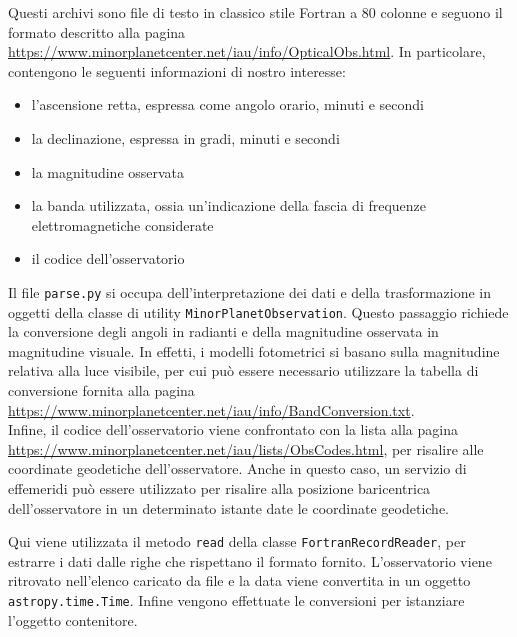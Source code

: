 \documentclass[12pt,a4paper,openright,twoside]{book}
\begin{document}
Questi archivi sono file di testo in classico stile Fortran a 80 colonne e seguono il formato descritto alla pagina \url{https://www.minorplanetcenter.net/iau/info/OpticalObs.html}. In particolare, contengono le seguenti informazioni di nostro interesse:
\begin{itemize}
\item l'ascensione retta, espressa come angolo orario, minuti e secondi
\item la declinazione, espressa in gradi, minuti e secondi
\item la magnitudine osservata
\item la banda utilizzata, ossia un'indicazione della fascia di frequenze elettromagnetiche considerate
\item il codice dell'osservatorio
\end{itemize}
Il file \lstinline{parse.py} si occupa dell'interpretazione dei dati e della trasformazione in oggetti della classe di utility \lstinline{MinorPlanetObservation}. Questo passaggio richiede la conversione degli angoli in radianti e della magnitudine osservata in magnitudine visuale. In effetti, i modelli fotometrici si basano sulla magnitudine relativa alla luce visibile, per cui può essere necessario utilizzare la tabella di conversione fornita alla pagina \url{https://www.minorplanetcenter.net/iau/info/BandConversion.txt}. \\
Infine, il codice dell'osservatorio viene confrontato con la lista alla pagina \url{https://www.minorplanetcenter.net/iau/lists/ObsCodes.html}, per risalire alle coordinate geodetiche dell'osservatore. Anche in questo caso, un servizio di effemeridi può essere utilizzato per risalire alla posizione baricentrica dell'osservatore in un determinato istante date le coordinate geodetiche.

Qui viene utilizzata il metodo \lstinline{read} della classe \lstinline{FortranRecordReader}, per estrarre i dati dalle righe che rispettano il formato fornito. L'osservatorio viene ritrovato nell'elenco caricato da file e la data viene convertita in un oggetto \lstinline{astropy.time.Time}. Infine vengono effettuate le conversioni per istanziare l'oggetto contenitore. \\
\end{document}
